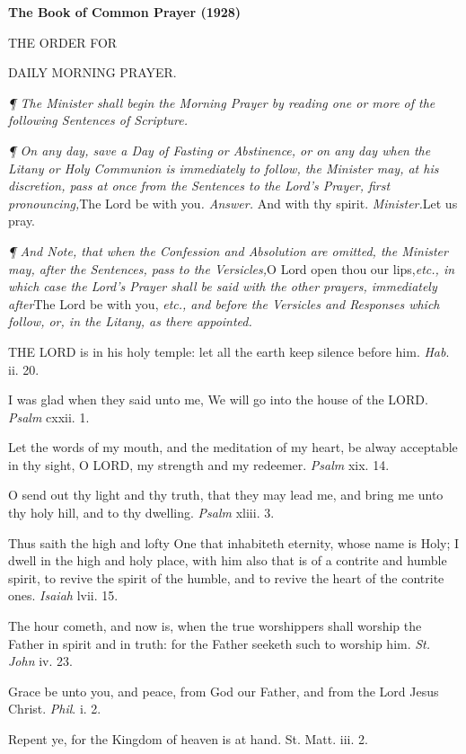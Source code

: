 
\textbf{The Book of Common Prayer (1928)}

THE
ORDER FOR

DAILY
MORNING PRAYER.

\emph{¶ The Minister shall begin the Morning Prayer
by reading one or more of the following Sentences of Scripture.}

\emph{¶
On any day, save a Day of Fasting or Abstinence, or on any day when the
Litany or Holy Communion is immediately to follow, the Minister may, at
his discretion, pass at once from the Sentences to the Lord's Prayer,
first pronouncing,}The Lord be with you\emph{.
Answer.} And with thy spirit. \emph{Minister.}Let us pray.

\emph{¶
And Note, that when the Confession and Absolution are omitted, the Minister
may, after the Sentences, pass to the Versicles,}O
Lord open thou our lips,\emph{etc., in which case the Lord's Prayer shall
be said with the other prayers, immediately after}The Lord be with
you, \emph{etc., and before the Versicles and Responses which follow, or,
in the Litany, as there appointed.}

THE
LORD is in his holy temple: let all the earth keep
silence before him. \emph{Hab}. ii. 20.

I was glad when they said unto me, We will go into
the house of the LORD. \emph{Psalm} cxxii.
1.

Let the words of my mouth, and the meditation of my
heart, be alway acceptable in thy sight, O LORD,
my strength and my redeemer. \emph{Psalm} xix. 14.

O send out thy light and thy truth, that they may lead
me, and bring me unto thy holy hill, and to thy dwelling. \emph{Psalm}
xliii. 3.

Thus saith the high and lofty One that inhabiteth eternity,
whose name is Holy; I dwell in the high and holy place, with him also
that is of a contrite and humble spirit, to revive the spirit of the humble,
and to revive the heart of the contrite ones. \emph{Isaiah} lvii.
15.

The hour cometh, and now is, when the true worshippers
shall worship the Father in spirit and in truth: for the Father seeketh
such to worship him. \emph{St. John} iv. 23.

Grace be unto you, and peace, from God our Father,
and from the Lord Jesus Christ. \emph{Phil}. i. 2. 

Repent ye, for the Kingdom of heaven is at hand. St. Matt. iii.
2.

